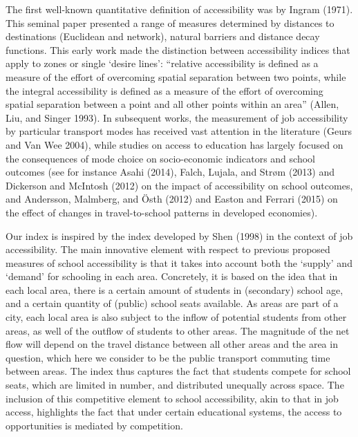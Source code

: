 \documentclass[3p,authoryear,preprint,review,12pt]{elsarticle}
\begin{document}
The first well-known quantitative definition of accessibility was by Ingram (1971).
This seminal paper presented a range of measures determined by
distances to destinations (Euclidean and network), natural barriers and 
distance decay functions. This early work made the distinction
between accessibility indices that apply to zones or single `desire
lines': ``relative accessibility is defined as a measure of the effort of overcoming spatial separation between two points, while the integral accessibility is defined as a measure of the effort of overcoming spatial separation between a point and all other points within an area'' (Allen, Liu, and Singer 1993). In subsequent works, the measurement of job accessibility by particular transport modes has received vast attention in the literature (Geurs and Van Wee 2004), while studies on access to education has largely focused on the consequences of mode choice on socio-economic indicators and school outcomes (see for instance Asahi (2014), Falch, Lujala, and Str{ø}m (2013) and Dickerson and McIntosh (2012) on the impact of accessibility on school outcomes, and Andersson, Malmberg, and {Ö}sth (2012) and Easton and Ferrari (2015) on the effect of changes in travel-to-school patterns in developed economies).

Our index is inspired by the index developed by Shen (1998) in the
context of job accessibility. The main innovative element with respect to previous proposed measures of school accessibility is that it takes into account both the `supply' and `demand' for schooling in each area. Concretely, it is based on the idea that in each local area, there is a certain amount of students in (secondary) school age, and a certain quantity of (public) school seats available. As areas are part of a city, each local area is also subject to the inflow of potential students from other areas, as well of the outflow of students to other areas. The magnitude of the net flow will depend on the travel distance between all other areas and the area in question, which here we consider to be the public transport commuting time between areas. The index thus
captures the fact that students compete for school seats, which are
limited in number, and distributed unequally across space. The inclusion of this competitive element to school accessibility, akin to that in job access, highlights the fact that under certain educational systems, the access to opportunities is mediated by competition.
\end{document}
